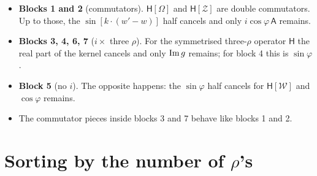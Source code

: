 \documentclass[10pt]{article}
\numberwithin{equation}{section}
\begin{document}
\begin{itemize}
\item \textbf{Blocks 1 and 2} (commutators). $\mathsf{H}[\Omega]$ and $\mathsf{H}[\mathcal{Z}]$ are double commutators. Up to those, the $\sin[k\cdot(w'-w)]$ half cancels and only $i\cos\varphi\,\mathsf{A}$ remains.
\item \textbf{Blocks 3, 4, 6, 7} ($i\times$ three $\rho$). For the symmetrised three-$\rho$ operator $\mathsf{H}$ the real part of the kernel cancels and only ${\rm Im}\,g$ remains; for block 4 this is $\sin\varphi$.
\item \textbf{Block 5} (no $i$). The opposite happens: the $\sin\varphi$ half cancels for $\mathsf{H}[\mathcal{W}]$ and $\cos\varphi$ remains.
\item The commutator pieces inside blocks 3 and 7 behave like blocks 1 and 2.
\end{itemize}

\section{Sorting by the number of $\rho$'s}
\end{document}
